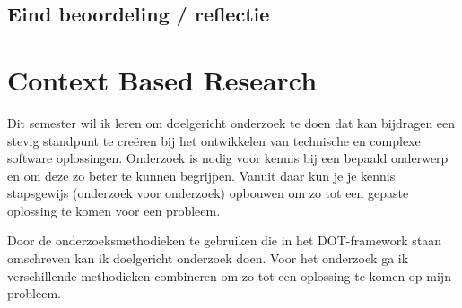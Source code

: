 \bigskip
\subsection{Eind beoordeling / reflectie}
%

\newpage


\section{Context Based Research}\label{sec:context-based-research}


Dit semester wil ik leren om doelgericht onderzoek te doen dat kan bijdragen een stevig
standpunt te creëren bij het ontwikkelen van technische en complexe software oplossingen.
Onderzoek is nodig voor kennis bij een bepaald onderwerp en om deze zo beter te kunnen begrijpen.
Vanuit daar kun je je kennis stapsgewijs (onderzoek voor onderzoek) opbouwen om zo tot een gepaste oplossing te
komen voor een probleem.


Door de onderzoeksmethodieken te gebruiken die in het DOT-framework staan omschreven kan ik doelgericht onderzoek
doen.
Voor het onderzoek ga ik verschillende methodieken combineren om zo tot een oplossing te komen op mijn probleem.


